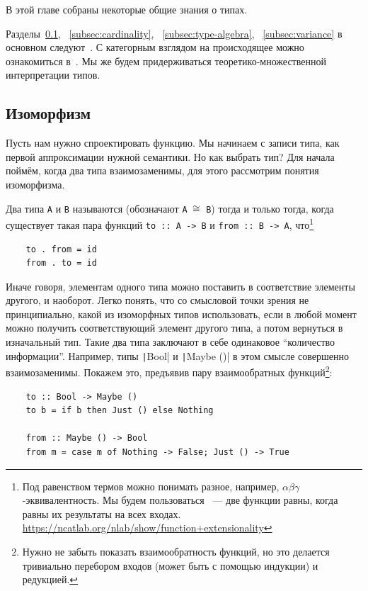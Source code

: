 В этой главе собраны некоторые общие знания о типах.

Разделы~\ref{subsec:isomorphism}, ~\ref{subsec:cardinality}, ~\ref{subsec:type-algebra}, ~\ref{subsec:variance} в основном следуют~\cite[глава 1]{maguire-types}.
С категорным взглядом на происходящее можно ознакомиться в~\cite{hinze2010reason}.
Мы же будем придерживаться теоретико-множественной интерпретации типов.

\subsection{Изоморфизм} \label{subsec:isomorphism}

Пусть нам нужно спроектировать функцию.
Мы начинаем с записи типа, как первой аппроксимации нужной семантики.
Но как выбрать тип?
Для начала поймём, когда два типа взаимозаменимы, для этого рассмотрим понятия изоморфизма.

Два типа \texttt{A} и \texttt{B} называются  (обозначают \texttt{A $\cong$ B}) тогда и только тогда, когда существует такая пара функций \texttt{to :: A -> B} и \texttt{from :: B -> A}, что\footnote{Под равенством термов можно понимать разное, например, $\alpha\beta\gamma$-эквивалентность. Мы будем пользоваться ~--- две функции равны, когда равны их результаты на всех входах. \url{https://ncatlab.org/nlab/show/function+extensionality}}
\begin{verbatim}
    to . from = id
    from . to = id
\end{verbatim}

Иначе говоря, элементам одного типа можно поставить в соответствие элементы другого, и наоборот.
Легко понять, что со смысловой точки зрения не принципиально, какой из изоморфных типов использовать, если в любой момент можно получить соответствующий элемент другого типа, а потом вернуться в изначальный тип.
Такие два типа заключают в себе одинаковое ``количество информации''.
Например, типы \texttt|Bool| и \texttt|Maybe ()| в этом смысле совершенно взаимозаменимы.
Покажем это, предъявив пару взаимообратных функций\footnote{Нужно не забыть показать взаимообратность функций, но это делается тривиально перебором входов (может быть с помощью индукции) и редукцией.}:
\begin{verbatim}
    to :: Bool -> Maybe ()
    to b = if b then Just () else Nothing

    from :: Maybe () -> Bool
    from m = case m of Nothing -> False; Just () -> True
\end{verbatim}

